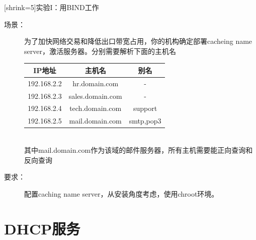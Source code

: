 \begin{frame}{[shrink=5]实验I：用BIND工作}


\begin{description}
\item [{场景：}] 为了加快网络交易和降低出口带宽占用，你的机构确定部署cacheing name server，激活服务器。分别需要解析下面的主机名\\
\begin{tabular}{|c|c|c|}
\hline 
IP地址 & 主机名 & 别名\tabularnewline
\hline 
\hline 
192.168.2.2 & hr.domain.com & -\tabularnewline
\hline 
192.168.2.3 & sales.domain.com & -\tabularnewline
\hline 
192.168.2.4 & tech.domain.com & support\tabularnewline
\hline 
192.168.2.5 & mail.domain.com & smtp,pop3\tabularnewline
\hline 
\end{tabular}\\
其中mail.domain.com作为该域的邮件服务器，所有主机需要能正向查询和反向查询
\item [{要求：}] 配置caching name server，从安装角度考虑，使用chroot环境。
\end{description}





\end{frame} 
\section{DHCP服务}



